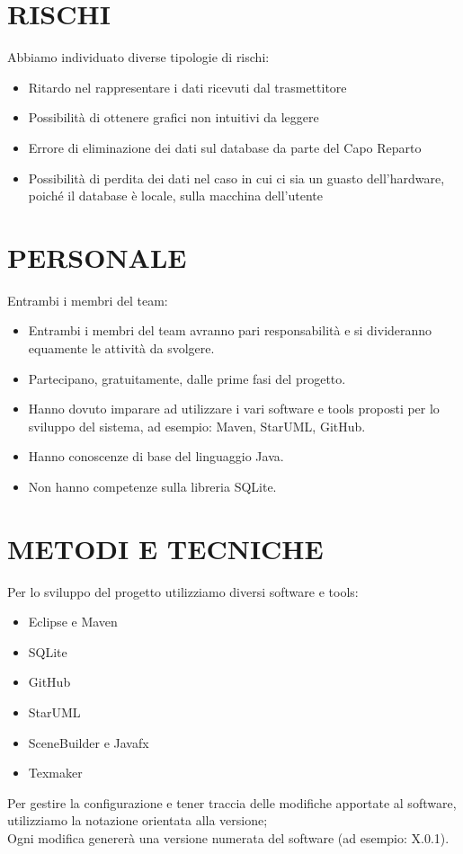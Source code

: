 \documentclass{report}
\begin{document}
\chapter{RISCHI}
Abbiamo individuato diverse tipologie di rischi:
\begin{itemize}
\item Ritardo nel rappresentare i dati ricevuti dal trasmettitore
\item Possibilità di ottenere grafici non intuitivi da leggere
\item Errore di eliminazione dei dati sul database da parte del Capo Reparto
\item Possibilità di perdita dei dati nel caso in cui ci sia un guasto dell'hardware, poiché il database è locale, sulla macchina dell'utente
\end{itemize}

\begingroup
\let\clearpage\relax
\chapter{PERSONALE}
\endgroup
Entrambi i membri del team:
\begin{itemize}
\item Entrambi i membri del team avranno pari responsabilità e si divideranno equamente le attività da svolgere.
\item Partecipano, gratuitamente, dalle prime fasi del progetto.
\item Hanno dovuto imparare ad utilizzare i vari software e tools proposti per lo sviluppo del sistema, ad esempio:
 Maven, StarUML, GitHub.
\item Hanno conoscenze di base del linguaggio Java.
\item Non hanno competenze sulla libreria SQLite.
\end{itemize}

\chapter{METODI E TECNICHE}
Per lo sviluppo del progetto utilizziamo diversi software e tools:
\begin{itemize}
\item Eclipse e Maven
\item SQLite
\item GitHub
\item StarUML
\item SceneBuilder e Javafx
\item Texmaker
\end{itemize}
Per gestire la configurazione e tener traccia delle modifiche apportate al software, utilizziamo la notazione orientata alla versione;\\
Ogni modifica genererà una versione numerata del software (ad esempio: X.0.1).
\end{document}
